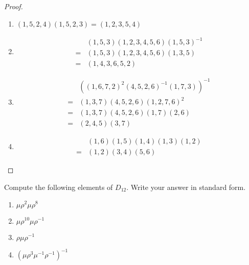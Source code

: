 \begin{proof}
    \begin{enumerate}[label={\textbf{\alph*.}}]
        \item $(1, 5, 2, 4)(1, 5, 2, 3) = (1, 2, 3, 5, 4)$
        \item \begin{align*}
                    & (1, 5, 3)(1, 2, 3, 4, 5, 6){(1, 5, 3)}^{-1} \\
                  = & (1, 5, 3)(1, 2, 3, 4, 5, 6)(1, 3, 5)        \\
                  = & (1, 4, 3, 6, 5, 2)
              \end{align*}
        \item \begin{align*}
                    & {({(1, 6, 7, 2)}^{2}{(4, 5, 2, 6)}^{-1}(1, 7, 3))}^{-1} \\
                  = & (1, 3, 7)(4, 5, 2, 6){(1, 2, 7, 6)}^{2}                 \\
                  = & (1, 3, 7)(4, 5, 2, 6)(1, 7)(2, 6)                       \\
                  = & (2, 4, 5)(3, 7)
              \end{align*}
        \item \begin{align*}
                    & (1, 6)(1, 5)(1, 4)(1, 3)(1, 2) \\
                  = & (1, 2)(3, 4)(5, 6)
              \end{align*}
    \end{enumerate}
\end{proof}

\newpage
\begin{exercise}
    Compute the following elements of $D_{12}$. Write your answer in standard form.
    \begin{enumerate}[label={\textbf{\alph*.}}]
        \item $\mu{\rho}^{2}\mu{\rho}^{8}$
        \item $\mu{\rho}^{10}\mu{\rho}^{-1}$
        \item $\rho\mu{\rho}^{-1}$
        \item ${(\mu{\rho}^{3}{\mu}^{-1}{\rho}^{-1})}^{-1}$
    \end{enumerate}
\end{exercise}

